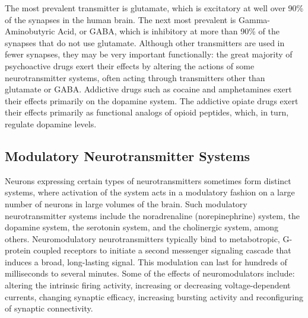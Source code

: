 The most prevalent transmitter is glutamate, which is excitatory at well over 90\% of the synapses in the human brain. The next most prevalent is Gamma-Aminobutyric Acid, or GABA, which is inhibitory at more than 90\% of the synapses that do not use glutamate. Although other transmitters are used in fewer synapses, they may be very important functionally: the great majority of psychoactive drugs exert their effects by altering the actions of some neurotransmitter systems, often acting through transmitters other than glutamate or GABA. Addictive drugs such as cocaine and amphetamines exert their effects primarily on the dopamine system. The addictive opiate drugs exert their effects primarily as functional analogs of opioid peptides, which, in turn, regulate dopamine levels.

\hypertarget{modulatory-neurotransmitter-systems}{%
\subsection{Modulatory Neurotransmitter Systems}\label{modulatory-neurotransmitter-systems}}

Neurons expressing certain types of neurotransmitters sometimes form distinct systems, where activation of the system acts in a modulatory fashion on a large number of neurons in large volumes of the brain. Such modulatory neurotransmitter systems include the noradrenaline (norepinephrine) system, the dopamine system, the serotonin system, and the cholinergic system, among others. Neuromodulatory neurotransmitters typically bind to metabotropic, G-protein coupled receptors to initiate a second messenger signaling cascade that induces a broad, long-lasting signal. This modulation can last for hundreds of milliseconds to several minutes. Some of the effects of neuromodulators include: altering the intrinsic firing activity, increasing or decreasing voltage-dependent currents, changing synaptic efficacy, increasing bursting activity and reconfiguring of synaptic connectivity.

